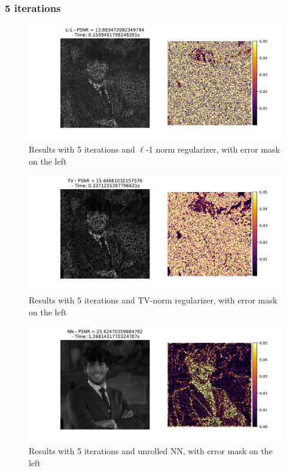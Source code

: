 \documentclass[12pt]{article}
\begin{document}
\subsubsection{5 iterations}
\begin{figure}
    \centering
    \includegraphics[width=12cm]{hw3/codes/exercise2/results/comparisons/me_comparison_l1_5.pdf}
    \caption{Results with 5 iterations and $\ell$-1 norm regularizer, with error mask on the left}
    \label{fig:comparison-l1-5}
\end{figure}

\begin{figure}
    \centering
    \includegraphics[width=12cm]{hw3/codes/exercise2/results/comparisons/me_comparison_tv_5.pdf}
    \caption{Results with 5 iterations and TV-norm regularizer, with error mask on the left}
    \label{fig:comparison-tv-5}
\end{figure}

\begin{figure}
    \centering
    \includegraphics[width=12cm]{hw3/codes/exercise2/results/comparisons/me_comparison_nn_5.pdf}
    \caption{Results with 5 iterations and unrolled NN, with error mask on the left}
    \label{fig:comparison-nn-5}
\end{figure}
\end{document}
